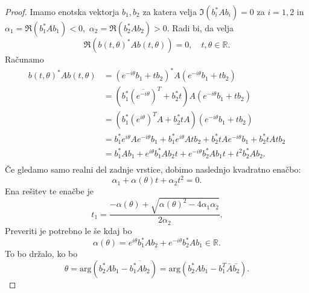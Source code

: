 \documentclass[12pt,a4paper]{amsart}
\theoremstyle{definition}
\theoremstyle{plain}
\newcommand{\R}{\mathbb R}
\begin{document}
\begin{proof}
Imamo enotska vektorja $b_1, b_2$ za katera velja $\Im(b_i^\ast Ab_i)=0$ za $i=1,2$ in $\alpha_1=\Re(b_1^\ast Ab_1)<0,$ $\alpha_2=\Re(b_2^\ast Ab_2)>0$. Radi bi, da velja
$$\Re(b(t,\theta)^\ast Ab(t,\theta))=0, \quad t,\theta \in \R.$$
Računamo
\begin{align*}
b(t,\theta)^\ast Ab(t,\theta) &=(e^{-i\theta}b_1 + tb_2)^\ast A (e^{-i\theta}b_1 + tb_2)\\
& = (b_{1}^\ast(\overline{e^{-i\theta}})^T  +b_{2}^\ast t ) A (e^{-i\theta}b_1 + tb_2)\\
& = (b_{1}^\ast(e^{i\theta})^T A+ b_{2}^\ast t A) (e^{-i\theta}b_1 + tb_2)\\
& = b_1 ^\ast e^{i\theta} A e^{-i\theta}b_1 + b_1 ^\ast e^{i\theta} A tb_2 + b_2 ^\ast t A e^{-i\theta} b_1 + b_2 ^\ast t Atb_2\\
& = b_1 ^\ast Ab_1 + e^{i\theta} b_1 ^\ast A b_2 t + e^{-i\theta}b_2 ^\ast Ab_1 t + t^2 b_2 ^\ast Ab_2 .\\
\end{align*}
Če gledamo samo realni del zadnje vrstice, dobimo naslednjo kvadratno enačbo:
$$\alpha _1 +  \alpha(\theta)t +  \alpha_2 t^2 =0.$$
Ena rešitev te enačbe je 
$$t_1 = \frac{-\alpha(\theta) + \sqrt{\alpha(\theta)^2 - 4\alpha_1 \alpha_2}}{2\alpha_2}.$$
Preveriti je potrebno le še kdaj bo $$\alpha(\theta)=e^{i\theta}b_1^\ast Ab_2 +e^{-i\theta}b_2^\ast Ab_1 \in \R.$$
To bo držalo, ko bo $$\theta = \text{arg}(b_2^\ast Ab_1 - \overline{b_1^\ast Ab_2}) = \text{arg}(b_2^\ast Ab_1 -b_1^T\bar{A}\bar{b_2}).$$
\end{proof}
\end{document}
